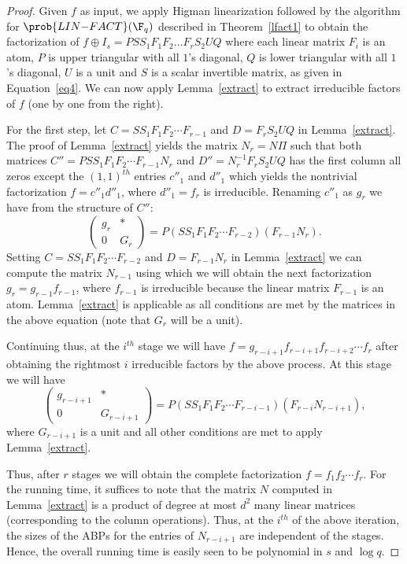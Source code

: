 \begin{proof}
  Given $f$ as input, we apply Higman linearization followed by the
  algorithm for $\prob{LIN{-}FACT}(\F_q)$ described in
  Theorem~\ref{lfact1} to obtain the factorization of $f\oplus I_s=PSS_1F_1F_2 \ldots F_rS_2UQ$ where 
each linear matrix $F_i$ is an atom, $P$ is upper triangular
with all $1$'s diagonal, $Q$ is lower triangular with all $1$'s
diagonal, $U$ is a unit and $S$ is a scalar invertible matrix, as given in Equation~\ref{eq4}. 
%
   We can now apply Lemma~\ref{extract} to
  extract irreducible factors of $f$ (one by one from the right).

  For the first step, let $C=S S_1F_1F_2\cdots F_{r-1}$ and $D=F_rS_2UQ$
  in Lemma~\ref{extract}. The proof of Lemma~\ref{extract} yields the
  matrix $N_r=N\Pi$ such that both matrices $C''=PS S_1F_1F_2\cdots
  F_{r-1}N_r$ and $D''=N_r^{-1}F_rS_2UQ$ has the first column all zeros
  except the $(1,1)^{th}$ entries $c''_1$ and $d''_1$ which yields the
  nontrivial factorization $f=c''_1d''_1$, where $d''_1=f_r$ is 
  irreducible. Renaming $c''_1$ as $g_r$ we have from the structure of
  $C''$:
  \[
  \left( \begin{array}{cc} g_r & * \\ 0 & G_r \end{array} \right) =
  P(SS_1F_1F_2\cdots F_{r-2}) (F_{r-1}N_r).
  \]
Setting $C= SS_1F_1F_2\cdots F_{r-2}$ and $D=F_{r-1}N_r$ in
Lemma~\ref{extract} we can compute the matrix $N_{r-1}$ using which we
will obtain the next factorization $g_r=g_{r-1}f_{r-1}$, where
$f_{r-1}$ is irreducible because the linear matrix $F_{r-1}$ is an
atom. Lemma~\ref{extract} is applicable as all conditions are met by
the matrices in the above equation (note that $G_r$ will be a unit).

Continuing thus, at the $i^{th}$ stage we will have
$f=g_{r-i+1}f_{r-i+1}f_{r-i+2}\cdots f_r$ after obtaining the
rightmost $i$ irreducible factors by the above process. At this stage
we will have
  \[
  \left( \begin{array}{cc} g_{r-i+1} & * \\ 0 & G_{r-i+1} \end{array}
  \right) = P(SS_1F_1F_2\cdots F_{r-i-1}) (F_{r-i}N_{r-i+1}),
  \]
  where $G_{r-i+1}$ is a unit and all other conditions are met to
  apply Lemma~\ref{extract}.

  Thus, after $r$ stages we will obtain the complete factorization
  $f=f_1f_2\cdots f_r$. For the running time, it suffices to note that
  the matrix $N$ computed in Lemma~\ref{extract} is a product of
  degree at most $d^2$ many linear matrices (corresponding to the
  column operations). Thus, at the $i^{th}$ of the above iteration,
  the sizes of the ABPs for the entries of $N_{r-i+1}$ are independent
  of the stages. Hence, the overall running time is easily seen to be
  polynomial in $s$ and $\log q$.
\end{proof}


